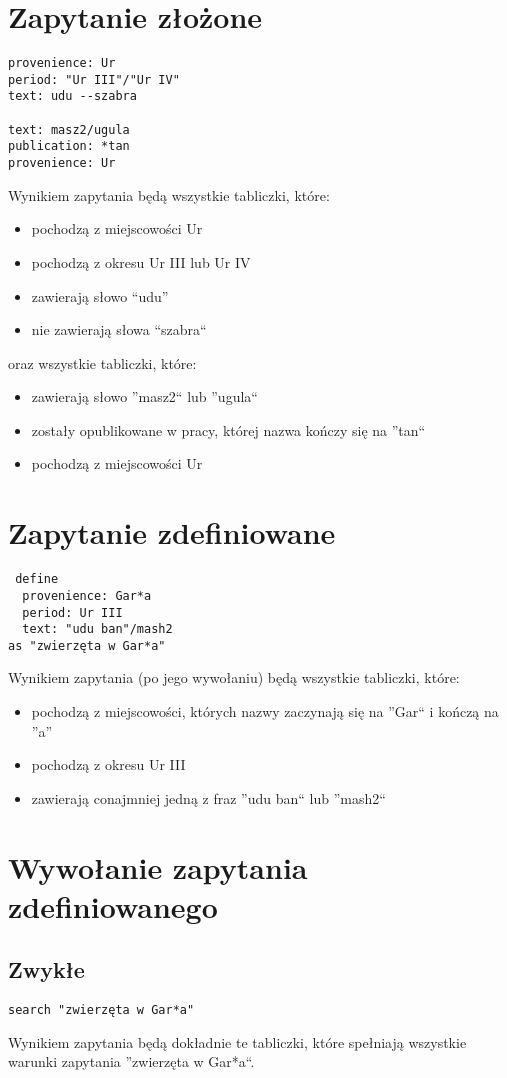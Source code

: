 \section{Zapytanie złożone}
\begin{verbatim}
provenience: Ur
period: "Ur III"/"Ur IV"
text: udu --szabra

text: masz2/ugula
publication: *tan
provenience: Ur
\end{verbatim}
Wynikiem zapytania będą wszystkie tabliczki, które:
\begin{itemize}
 \item pochodzą z miejscowości Ur
 \item pochodzą z okresu Ur III lub Ur IV
 \item zawierają słowo ``udu''
 \item nie zawierają słowa ``szabra``
\end{itemize}
oraz wszystkie tabliczki, które:
\begin{itemize}
 \item zawierają słowo ''masz2`` lub ''ugula``
 \item zostały opublikowane w pracy, której nazwa kończy się na ''tan``
 \item pochodzą z miejscowości Ur
\end{itemize}


\section{Zapytanie zdefiniowane}
\begin{verbatim}
 define
  provenience: Gar*a
  period: Ur III
  text: "udu ban"/mash2
as "zwierzęta w Gar*a"
\end{verbatim}
Wynikiem zapytania (po jego wywołaniu) będą wszystkie tabliczki, które:
\begin{itemize}
\item pochodzą z miejscowości, których nazwy zaczynają się na ''Gar`` i kończą na ''a''
\item pochodzą z okresu Ur III
\item zawierają conajmniej jedną z fraz ''udu ban`` lub ''mash2``
\end{itemize}

\section{Wywołanie zapytania zdefiniowanego}
\subsection{Zwykłe}
\begin{verbatim}
search "zwierzęta w Gar*a"
\end{verbatim}
Wynikiem zapytania będą dokładnie te tabliczki, które spełniają wszystkie warunki zapytania ''zwierzęta w Gar*a``.

